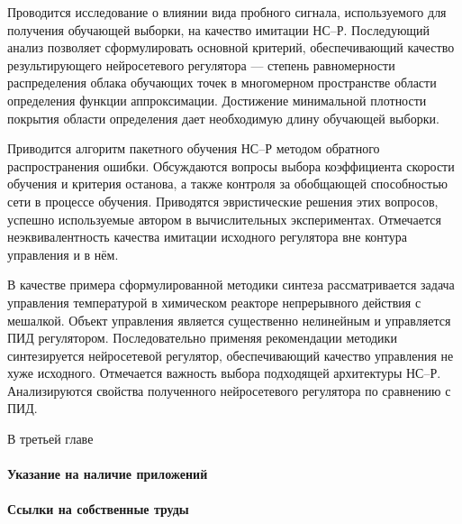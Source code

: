 Проводится исследование о влиянии вида пробного сигнала, используемого
для получения обучающей выборки, на качество имитации НС--Р.
Последующий анализ позволяет сформулировать основной критерий,
обеспечивающий качество результирующего нейросетевого регулятора ---
степень равномерности распределения облака обучающих точек в
многомерном пространстве области определения функции аппроксимации.
Достижение минимальной плотности покрытия области определения дает
необходимую длину обучающей выборки.

Приводится алгоритм пакетного обучения НС--Р методом обратного
распространения ошибки.  Обсуждаются вопросы выбора коэффициента
скорости обучения и критерия останова, а также контроля за обобщающей
способностью сети в процессе обучения.  Приводятся эвристические
решения этих вопросов, успешно используемые автором в вычислительных
экспериментах.  Отмечается неэквивалентность качества имитации
исходного регулятора вне контура управления и в нём.

В качестве примера сформулированной методики синтеза рассматривается
задача управления температурой в химическом реакторе непрерывного
действия с мешалкой.  Объект управления является существенно
нелинейным и управляется ПИД регулятором.  Последовательно применяя
рекомендации методики синтезируется нейросетевой регулятор,
обеспечивающий качество управления не хуже исходного.  Отмечается
важность выбора подходящей архитектуры НС--Р.  Анализируются свойства
полученного нейросетевого регулятора по сравнению с ПИД.


В третьей главе



\paragraph{Указание на наличие приложений}

\paragraph{Ссылки на собственные труды}
